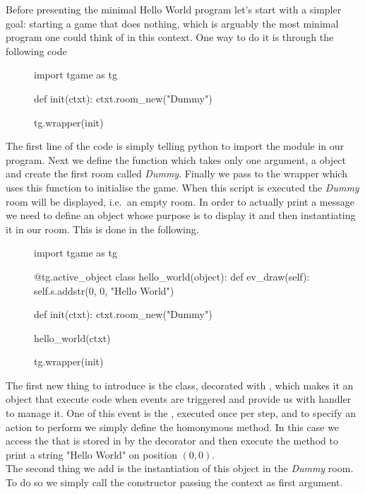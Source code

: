 
Before presenting the minimal Hello World program let's start with a simpler goal: starting a game that does nothing, which is arguably the most minimal program one could think of in this context. One way to do it is through the following code

\begin{figure}[htb]
\begin{snippet}
import tgame as tg

def init(ctxt):
	ctxt.room_new("Dummy")
	
tg.wrapper(init)
\end{snippet}
\end{figure}

The first line of the code is simply telling python to import the  module in our program. Next we define the function  which takes only one argument, a  object and create the first room called \textit{Dummy}. Finally we pass  to the wrapper which uses this function to initialise the game. When this script is executed the \textit{Dummy} room will be displayed, i.e.\ an empty room.
In order to actually print a message we need to define an object whose purpose is to display it and then instantiating it in our room. This is done in the following.

\begin{figure}[htb]
\begin{snippet}
import tgame as tg

@tg.active_object
class hello_world(object):
	def ev_draw(self):
		self.s.addstr(0, 0, "Hello World")

def init(ctxt):
	ctxt.room_new("Dummy")
	
	hello_world(ctxt)
	
tg.wrapper(init)
\end{snippet}
\end{figure}

The first new thing to introduce is the  class, decorated with , which makes it an object that execute code when events are triggered and provide us with handler to manage it. One of this event is the , executed once per step, and to specify an action to perform we simply define the homonymous method. In this case we access the  that is stored in  by the decorator and then execute the  method to print a string "Hello World" on position $(0, 0)$.\\
The second thing we add is the instantiation of this object in the \textit{Dummy} room. To do so we simply call the constructor passing the context as first argument.

